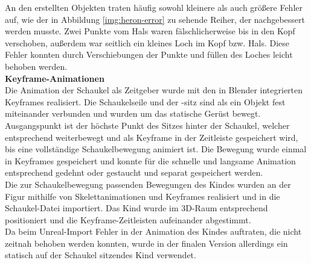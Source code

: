 \documentclass{Bericht}
\begin{document}
An den erstellten Objekten traten häufig sowohl kleinere als auch größere Fehler auf, wie der in Abbildung \ref{img:heron-error} zu sehende Reiher, der nachgebessert werden musste. Zwei Punkte vom Hals waren fälschlicherweise bis in den Kopf verschoben, außerdem war seitlich ein kleines Loch im Kopf bzw. Hals. Diese Fehler konnten durch Verschiebungen der Punkte und füllen des Loches leicht behoben werden.\\	
		 
\textbf{Keyframe-Animationen}\\
Die Animation der Schaukel als Zeitgeber wurde mit den in Blender integrierten Keyframes realisiert. Die Schaukelseile und der -sitz sind als ein Objekt fest miteinander verbunden und wurden um das statische Gerüst bewegt. Ausgangspunkt ist der höchste Punkt des Sitzes hinter der Schaukel, welcher entsprechend weiterbewegt und als Keyframe in der Zeitleiste gespeichert wird, bis eine vollständige Schaukelbewegung animiert ist. Die Bewegung wurde einmal in Keyframes gespeichert und konnte für die schnelle und langsame Animation entsprechend gedehnt oder gestaucht und separat gespeichert werden.\\
Die zur Schaukelbewegung passenden Bewegungen des Kindes wurden an der Figur mithilfe von Skelettanimationen und Keyframes realisiert und in die Schaukel-Datei importiert. Das Kind wurde im 3D-Raum entsprechend positioniert und die Keyframe-Zeitleisten aufeinander abgestimmt. \\
Da beim Unreal-Import Fehler in der Animation des Kindes auftraten, die nicht zeitnah behoben werden konnten, wurde in der finalen Version allerdings ein statisch auf der Schaukel sitzendes Kind verwendet. 
		
\end{document}
